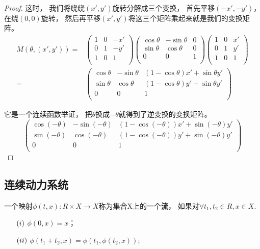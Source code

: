 \begin{proof}
这时，
我们将绕绕\((x',y')\)旋转分解成三个变换，
首先平移\((-x',-y')\)，
在绕\((0,0)\)旋转，
然后再平移\((x',y')\)将这三个矩阵乘起来就是我们的变换矩阵。
\begin{align*}
  M(\theta,(x',y'))= & \left(
  \begin{array}{ccc}
    1 & 0 & -x' \\
    0 & 1 & -y' \\
    1 & 0 & 1 \\
  \end{array}
\right)
\left(
  \begin{array}{ccc}
    \cos \theta & -\sin \theta & 0 \\
    \sin \theta & \cos \theta  & 0 \\
    0 & 0 & 1\\
  \end{array}
\right)
\left(
  \begin{array}{ccc}
    1 & 0 & x' \\
    0 & 1 & y' \\
    1 & 0 & 1 \\
  \end{array}
\right)\\
  = & \left(
  \begin{array}{ccc}
    \cos \theta & -\sin \theta & (1-\cos\theta)x'+\sin\theta y' \\
    \sin \theta & \cos \theta  & (1-\cos\theta)y'+\sin\theta y' \\
    0 & 0 & 1\\
  \end{array}
\right)
\end{align*}

它是一个连续函数举证，
把\(\theta\)换成\(-\theta\)就得到了逆变换的变换矩阵。
\[\left(
  \begin{array}{ccc}
    \cos (-\theta) & -\sin (-\theta) & (1-\cos(-\theta))x'+\sin(-\theta) y' \\
    \sin (-\theta) & \cos (-\theta)  & (1-\cos(-\theta))y'+\sin(-\theta) y' \\
    0 & 0 & 1\\
  \end{array}
\right)
\]

\end{proof}


\subsection{连续动力系统}

\begin{Defination}
一个映射\(\phi(t,x):R\times X \rightarrow X\)称为集合X上的一个\textbf{流}，
如果对\(\forall t_1,t_2 \in R,x\in X\).
\begin{enumerate}
                        \item [\((\romannumeral 1)\)]  \(\phi(0,x)=x\)；
                        \item [\((\romannumeral 2)\)]  \(\phi(t_1+t_2,x)=\phi(t_1,\phi(t_2,x))\);
                \end{enumerate}
\end{Defination}


